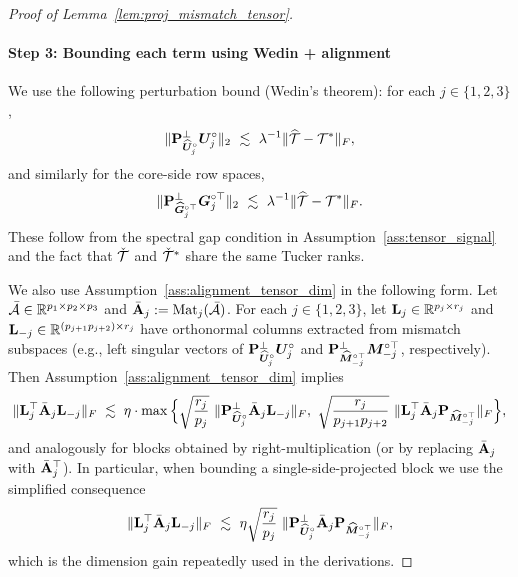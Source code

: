 \documentclass[authoryear,preprint,review,12pt]{elsarticle}
\begin{document}
{\begin{proof}[Proof of Lemma~\ref{lem:proj_mismatch_tensor}]
		\paragraph{Step 3: Bounding each term using Wedin + alignment}
		We use the following perturbation bound (Wedin's theorem): for each $j\in\{1,2,3\}$,
		\begin{equation}\label{eq:wedin_U}
			\|\mathbf{P}_{\widehat{\boldsymbol U}_j^\circ}^{\perp}\boldsymbol U_j^\circ\|_2
			\ \lesssim\
			\lambda^{-1}\|\widehat{\mathcal{T}}-\mathcal{T}^\ast\|_F,
		\end{equation}
		and similarly for the core-side row spaces,
		\begin{equation}\label{eq:wedin_G}
			\|\mathbf{P}_{\widehat{\boldsymbol G}_j^{\circ\top}}^{\perp}\boldsymbol G_j^{\circ\top}\|_2
			\ \lesssim\
			\lambda^{-1}\|\widehat{\mathcal{T}}-\mathcal{T}^\ast\|_F.
		\end{equation}
		These follow from the spectral gap condition in Assumption~\ref{ass:tensor_signal} and the fact that
		$\check{\mathcal{T}}$ and $\check{\mathcal{T}}^\ast$ share the same Tucker ranks.
		
		We also use Assumption~\ref{ass:alignment_tensor_dim} in the following form.
		Let $\bar{\mathcal{A}}\in\mathbb{R}^{p_1\times p_2\times p_3}$ and $\bar{\mathbf{A}}_j:=\mathrm{Mat}_j(\bar{\mathcal{A}})$.
		For each $j\in\{1,2,3\}$, let $\mathbf{L}_j\in\mathbb{R}^{p_j\times r_j}$ and $\mathbf{L}_{-j}\in\mathbb{R}^{(p_{j+1}p_{j+2})\times r_j}$
		have orthonormal columns extracted from mismatch subspaces (e.g., left singular vectors of
		$\mathbf{P}_{\widehat{\boldsymbol U}_j^\circ}^{\perp}\boldsymbol U_j^\circ$ and $\mathbf{P}_{\widehat{\boldsymbol M}_{-j}^{\circ\top}}^{\perp}\boldsymbol M_{-j}^{\circ\top}$, respectively).
		Then Assumption~\ref{ass:alignment_tensor_dim} implies
		\begin{equation}\label{eq:alignment_use}
			\|\bL_j^{\top}\bar{\bA}_j\bL_{-j}\|_F
			\;\lesssim\;
			\eta\cdot
			\max\Big\{
			\sqrt{\frac{r_j}{p_j}}\ \|\bP_{\widehat{\bU}_j^\circ}^{\perp}\bar{\bA}_j\bL_{-j}\|_F,\ 
			\sqrt{\frac{r_j}{p_{j+1}p_{j+2}}}\ \|\bL_j^{\top}\bar{\bA}_j\bP_{\widehat{\bM}_{-j}^{\circ\top}}\|_F
			\Big\},
		\end{equation}
		and analogously for blocks obtained by right-multiplication (or by replacing $\bar{\mathbf{A}}_j$ with $\bar{\mathbf{A}}_j^\top$).
		In particular, when bounding a single-side-projected block we use the simplified consequence
		\[
		\|\bL_j^{\top}\bar{\bA}_j\bL_{-j}\|_F
		\ \lesssim\
		\eta\sqrt{\frac{r_j}{p_j}}\ \|\bP_{\widehat{\bU}_j^\circ}^{\perp}\bar{\bA}_j\bP_{\widehat{\bM}_{-j}^{\circ\top}}\|_F,
		\]
		which is the dimension gain repeatedly used in the derivations.
		

\end{proof}}
\end{document}
